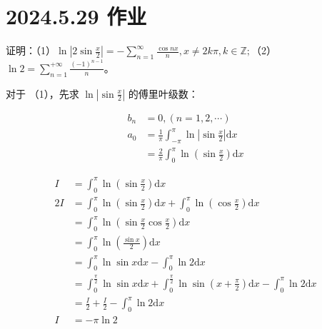 \ifx\allfiles\undefined

\date{}
\author{尹锦润}

\maketitle
\fi

\section{2024.5.29 作业}
\begin{ques}
	证明：（1）$\displaystyle \ln\left| 2\sin\frac{x}{2}\right| =-\sum _{n=1}^{\infty }\frac{\cos nx}{n} ,x\neq 2k\pi ,k\in \mathbb{Z} ;$（2）$\displaystyle \ln 2=\sum _{n=1}^{+\infty }\frac{( -1)^{n-1}}{n}$。
\end{ques}



对于 （1），先求 $\displaystyle \ln\left| \sin\frac{x}{2}\right| $ 的傅里叶级数：


\begin{align*}
	b_{n} & =0,( n=1,2,\cdots )\\
	a_{0} & =\frac{1}{\pi }\int _{-\pi }^{\pi }\ln\left| \sin\frac{x}{2}\right| \mathrm{d} x\\
	& =\frac{2}{\pi }\int _{0}^{\pi }\ln\left(\sin\frac{x}{2}\right)\mathrm{d} x
\end{align*}

\begin{align*}
	I & =\int _{0}^{\pi }\ln\left(\sin\frac{x}{2}\right)\mathrm{d} x\\
	2I & =\int _{0}^{\pi }\ln\left(\sin\frac{x}{2}\right)\mathrm{d} x+\int _{0}^{\pi }\ln\left(\cos\frac{x}{2}\right)\mathrm{d} x\\
	& =\int _{0}^{\pi }\ln\left(\sin\frac{x}{2}\cos\frac{x}{2}\right)\mathrm{d} x\\
	& =\int _{0}^{\pi }\ln\left(\frac{\sin x}{2}\right)\mathrm{d} x\\
	& =\int _{0}^{\pi }\ln\sin x\mathrm{d} x-\int _{0}^{\pi }\ln 2\mathrm{d} x\\
	& =\int _{0}^{\frac{\pi }{2}}\ln\sin x\mathrm{d} x+\int _{0}^{\frac{\pi }{2}}\ln\sin\left( x+\frac{\pi }{2}\right)\mathrm{d} x-\int _{0}^{\pi }\ln 2\mathrm{d} x\\
	& =\frac{I}{2} +\frac{I}{2} -\int _{0}^{\pi }\ln 2\mathrm{d} x\\
	I & =-\pi \ln 2
\end{align*}


